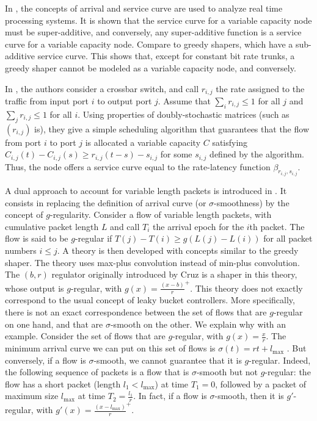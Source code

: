 In \cite{thiele98}, the concepts of arrival and service curve are
used to analyze real time processing systems. It is shown that the
service curve for a variable capacity node must be super-additive,
and conversely, any super-additive function is a service curve for
a variable capacity node. Compare to greedy shapers, which have a
sub-additive service curve. This shows that, except for constant
bit rate trunks, a greedy shaper cannot be modeled as a variable
capacity node, and conversely.

In \cite{chang99}, the authors consider a crossbar switch, and
call $r_{i, j}$ the rate assigned to the traffic from input port
$i$ to output port $j$. Assume that $\sum_i r_{i,j} \leq 1$ for
all $j$ and $\sum_j r_{i,j} \leq 1$ for all $i$. Using properties
of doubly-stochastic matrices (such as $(r_{i,j})$ is), they give
a simple scheduling algorithm that guarantees that the flow from
port $i$ to port $j$ is allocated a variable capacity $C$
satisfying $C_{i,j}(t) - C_{i,j}(s) \geq r_{i,j}(t-s) - s_{i,j}$
for some $s_{i,j}$ defined by the algorithm. Thus, the node offers
a service curve equal to the rate-latency function
$\beta_{r_{i,j}, s_{i,j}}$.

A dual approach to account for variable length packets is
introduced in \cite{Changbook}. It consists in replacing the
definition of arrival curve (or $\sigma$-smoothness) by the
concept of $g$-regularity. Consider a flow of variable length
packets, with cumulative packet length $L$ and call $T_i$ the
arrival epoch for the $i$th packet. The flow is said to be
$g$-regular if $T(j)-T(i) \geq g(L(j)-L(i))$ for all packet
numbers $i\leq j$. A theory is then developed with concepts
similar to the greedy shaper. The theory uses max-plus convolution
instead of min-plus convolution. The $(b, r)$ regulator originally
introduced by Cruz \cite{cru91a} is a shaper in this theory, whose
output is $g$-regular, with $g(x)=\frac{(x-b)}{r}^+$. This theory
does not exactly correspond to the usual concept of leaky bucket
controllers. More specifically, there is not an exact
correspondence between the set of flows that are $g$-regular on
one hand, and that are $\sigma$-smooth on the other. We explain
why with an example. Consider the set of flows that are
$g$-regular, with $g(x)=\frac{x}{r}$. The minimum arrival curve we
can put on this set of flows is $\sigma(t)= r t + l_{\max}$
\cite{Changbook}. But conversely, if a flow is $\sigma$-smooth, we
cannot guarantee that it is $g$-regular. Indeed, the following
sequence of packets is a flow that is $\sigma$-smooth but not
$g$-regular: the flow has a short packet (length $l_1<l_{\max}$)
at time $T_1=0$, followed by a packet of maximum size $l_{\max}$
at time $T_2=\frac{l_1}{r}$. In fact, if a flow is
$\sigma$-smooth, then it is $g'$-regular, with $g'(x)=
\frac{(x-l_{\max})}{r}^+$.

